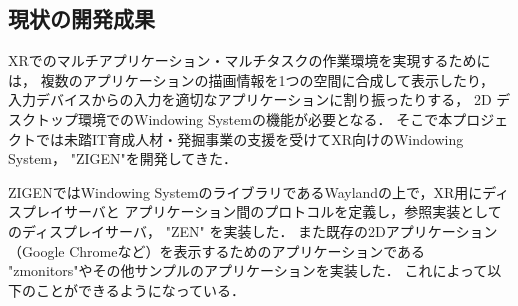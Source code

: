 \subsection{現状の開発成果}
\label{section:current-status}

XRでのマルチアプリケーション・マルチタスクの作業環境を実現するためには，
複数のアプリケーションの描画情報を1つの空間に合成して表示したり，
入力デバイスからの入力を適切なアプリケーションに割り振ったりする，
2D デスクトップ環境でのWindowing Systemの機能が必要となる．
そこで本プロジェクトでは未踏IT育成人材・発掘事業の支援を受けてXR向けのWindowing System，
"ZIGEN"を開発してきた．

ZIGENではWindowing SystemのライブラリであるWaylandの上で，XR用にディスプレイサーバと
アプリケーション間のプロトコルを定義し，参照実装としてのディスプレイサーバ， "ZEN" を実装した．
また既存の2Dアプリケーション（Google Chromeなど）を表示するためのアプリケーションである
"zmonitors"やその他サンプルのアプリケーションを実装した．
これによって以下のことができるようになっている．

